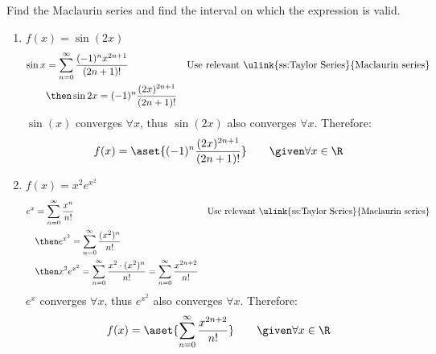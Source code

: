 Find the Maclaurin series and find the interval on which the expression is
valid.
\begin{enumerate}[itemsep=24em]
  \item \(\displaystyle  f(x) = \sin(2x) \)
    \begin{align*}
      \sin x &= \sum_{n=0}^{\infty} \frac{(-1)^nx^{2n+1} }{(2n+1)!}
      && \text{Use relevant \ulink{ss:Taylor Series}{Maclaurin series}} \\
      &\then \sin 2 x = (-1)^n \frac{(2x)^{2n+1} }{(2n+1)!}
    \end{align*}
    \(\sin(x)\) converges \(\forall x\), thus \(\sin(2x)\) also converges \(\forall x\).
    Therefore:
    \[%
      f(x) = \aset{(-1)^n \frac{(2x)^{2n+1} }{(2n+1)!}}
      \qquad \given \forall x \in \R
    \]%

  \vspace{-15em}
  \item \(\displaystyle  f(x) = x^2e^{x^{2} } \)
    \begin{align*}
      e^x &= \sum_{n=0}^{\infty} \frac{x^n}{n!}
      && \text{Use relevant \ulink{ss:Taylor Series}{Maclaurin series}} \\
      &\then e^{x^2} = \sum_{n=0}^{\infty} \frac{(x^2)^n}{n!} \\
      &\then x^2e^{x^2} = \sum_{n=0}^{\infty} \frac{x^2 \cdot (x^2)^n}{n!}
      = \sum_{n=0}^{\infty} \frac{x^{2n+2} }{n!}
    \end{align*}
    \(e^x\) converges \(\forall x\), thus \(e^{x^2} \) also converges \(\forall x\).
    Therefore:
    \[%
      f(x) = \aset{\sum_{n=0}^{\infty} \frac{x^{2n+2}}{n!}}
      \qquad \given \forall x \in \R
    \]%
\end{enumerate}

\newpage %

